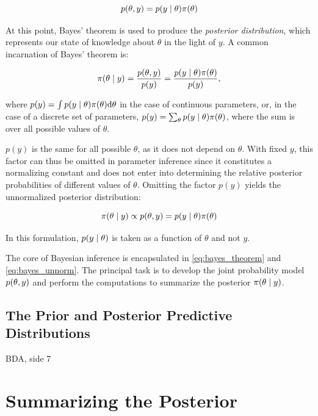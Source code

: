 \begin{equation*}
    p(\theta, y) = p \qty(y \mid \theta) \pi \qty(\theta) 
\end{equation*}

At this point, Bayes' theorem is used to produce the \textit{posterior distribution}, which represents our state of knowledge about $\theta$ in the light of $y$. A common incarnation of Bayes' theorem is:

\begin{equation}\label{eq:bayes_theorem}
    \pi \qty(\theta \mid y) = \frac{p(\theta, y)}{p(y)}  = \frac{p \qty(y \mid \theta) \pi \qty(\theta)}{p(y)},
\end{equation}

where $p(y) = \int p \qty(y \mid \theta) \pi \qty(\theta) \dd \theta$ in the case of continuous parameters, or, in the case of a discrete set of parameters, $p(y) = \sum_\theta p \qty(y \mid \theta) \pi \qty(\theta)$, where the sum is over all possible values of $\theta$.

$p(y)$ is the same for all possible $\theta$, as it does not depend on $\theta$. With fixed $y$, this factor can thus be omitted in parameter inference since it constitutes a normalizing constant and does not enter into determining the relative posterior probabilities of different values of $\theta$. Omitting the factor $p(y)$ yields the unnormalized posterior distribution: 

\begin{equation}\label{eq:bayes_unnorm}
    \pi \qty(\theta \mid y) \propto p(\theta, y) =  p \qty(y \mid \theta) \pi \qty(\theta) 
\end{equation}

In this formulation, $p \qty(y \mid \theta)$ is taken as a function of $\theta$ and not $y$.  

The core of Bayesian inference is encapsulated in \autoref{eq:bayes_theorem} and \autoref{eq:bayes_unnorm}. The principal task is to develop the joint probability model $p(\theta, y)$ and perform the computations to summarize the posterior $\pi \qty(\theta \mid y)$.




\subsection{The Prior and Posterior Predictive Distributions}\label{sec:predictive}

BDA, side 7

\section{Summarizing the Posterior}

